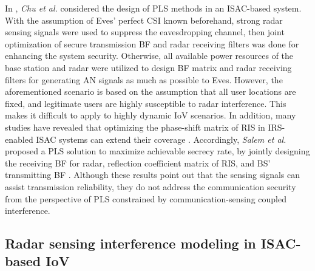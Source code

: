 In \cite{chu2023joint}, \emph{ Chu et al.} considered the design of 
PLS methods in an ISAC-based system. With the assumption of Eves' perfect CSI known beforehand, strong radar sensing signals were used to suppress the eavesdropping channel, then joint optimization of secure transmission BF and radar receiving filters was done for enhancing the system security. Otherwise, 
all available power resources of the base station and radar were utilized to design BF matrix and radar receiving filters for generating AN signals as much as possible to Eves. However, the aforementioned scenario is based on the assumption that all user locations are fixed, and legitimate users are highly susceptible to radar interference. This makes it difficult to apply to highly dynamic IoV scenarios.
In addition, many studies have revealed that optimizing the phase-shift matrix of RIS in IRS-enabled ISAC systems can extend their coverage \cite{qin2023joint,salem2022active}.
Accordingly, \emph{Salem et al.} proposed a PLS solution to maximize achievable secrecy rate,
by jointly designing the receiving BF for radar, reflection coefficient matrix of RIS, and BS' transmitting BF \cite{salem2022active}.
Although these results point out that the sensing signals can assist transmission reliability, they do not address the communication security from the perspective of PLS constrained by communication-sensing coupled interference.

\subsection{Radar sensing interference modeling in ISAC-based IoV}

\iffalse
To describe radar sensing capability, \emph{Martin et al.} introduced the concept of \emph{interruption} into radar networks, using radar interruption as a performance metric defined as the situation where a radar network cannot detect a specific object due to interference from others \cite{braun2013co}. \emph{Brooker} showed a high probability of interference in overlapping frequency bands by studying interference under different conditions and sensor types. Furthermore, they investigated mutual interference between mmWave radar systems operating in the 77 GHz and 94 GHz frequency bands \cite{brooker2007mutual}. Researchers have developed mathematical models to gain a deeper understanding of the mutual interference between automotive radars and to predict the degree of sensing interference in different scenarios. In \cite{al2018stochastic}, \emph{Al-Hourani et al.} pioneered the modelling of automotive radar interference based on stochastic geometry tools. They analyzed the interference between opposing lane radars using Poisson and lattice models, and proposed to estimate the probability of success of radar ranging based on closed-form interference statistics. In \cite{Fang2020Stochastic}, \emph{Fang et al.} studied radar interference in bidirectional multilane scenarios and modelled target radar cross section (RCS) fluctuations using Swerling I and Chi-Square models, obtaining closed-form expressions for radar SRP. These studies provide the foundation for the integration of communication and sensing.
\fi

